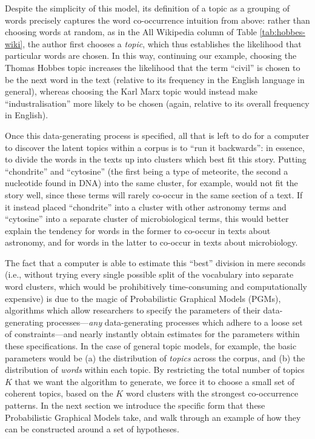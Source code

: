 \documentclass[11pt]{article}
\begin{document}
Despite the simplicity of this model, its definition of a topic as a grouping of words precisely captures the word co-occurrence intuition from above: rather than choosing words at random, as in the All Wikipedia column of Table \ref{tab:hobbes-wiki}, the author first chooses a \textit{topic}, which thus establishes the likelihood that particular words are chosen. In this way, continuing our example, choosing the Thomas Hobbes topic increases the likelihood that the term ``civil'' is chosen to be the next word in the text (relative to its frequency in the English language in general), whereas choosing the Karl Marx topic would instead make ``industralisation'' more likely to be chosen (again, relative to its overall frequency in English).

Once this data-generating process is specified, all that is left to do for a computer to discover the latent topics within a corpus is to ``run it backwards'': in essence, to divide the words in the texts up into clusters which best fit this story. Putting ``chondrite'' and ``cytosine'' (the first being a type of meteorite, the second a nucleotide found in DNA) into the same cluster, for example, would not fit the story well, since these terms will rarely co-occur in the same section of a text. If it instead placed ``chondrite'' into a cluster with other astronomy terms and ``cytosine'' into a separate cluster of microbiological terms, this would better explain the tendency for words in the former to co-occur in texts about astronomy, and for words in the latter to co-occur in texts about microbiology.

The fact that a computer is able to estimate this ``best'' division in mere seconds (i.e., without trying every single possible split of the vocabulary into separate word clusters, which would be prohibitively time-consuming and computationally expensive) is due to the magic of Probabilistic Graphical Models (PGMs), algorithms which allow researchers to specify the parameters of their data-generating processes---\textit{any} data-generating processes which adhere to a loose set of constraints---and nearly instantly obtain estimates for the parameters within these specifications. In the case of general topic models, for example, the basic parameters would be (a) the distribution of \textit{topics} across the corpus, and (b) the distribution of \textit{words} within each topic. By restricting the total number of topics $K$ that we want the algorithm to generate, we force it to choose a small set of coherent topics, based on the $K$ word clusters with the strongest co-occurrence patterns. In the next section we introduce the specific form that these Probabilistic Graphical Models take, and walk through an example of how they can be constructed around a set of hypotheses.
\end{document}
